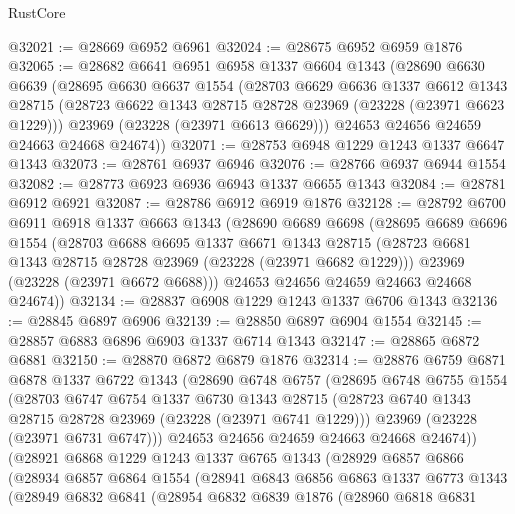 \begin{lexlean}{RustCore}
\begin{coremodule}
@32021 := @28669 @6952 @6961
@32024 := @28675 @6952 @6959 @1876
@32065 := @28682
    @6641
    @6951
    @6958
    @1337
    @6604
    @1343
    (@28690
      @6630
      @6639
      (@28695
        @6630
        @6637
        @1554
        (@28703
          @6629
          @6636
          @1337
          @6612
          @1343
          @28715
          (@28723 @6622 @1343 @28715 @28728 @23969 (@23228 (@23971 @6623 @1229)))
          @23969
          (@23228 (@23971 @6613 @6629)))
        @24653
        @24656
        @24659
        @24663
        @24668
        @24674))
@32071 := @28753 @6948 @1229 @1243 @1337 @6647 @1343
@32073 := @28761 @6937 @6946
@32076 := @28766 @6937 @6944 @1554
@32082 := @28773 @6923 @6936 @6943 @1337 @6655 @1343
@32084 := @28781 @6912 @6921
@32087 := @28786 @6912 @6919 @1876
@32128 := @28792
    @6700
    @6911
    @6918
    @1337
    @6663
    @1343
    (@28690
      @6689
      @6698
      (@28695
        @6689
        @6696
        @1554
        (@28703
          @6688
          @6695
          @1337
          @6671
          @1343
          @28715
          (@28723 @6681 @1343 @28715 @28728 @23969 (@23228 (@23971 @6682 @1229)))
          @23969
          (@23228 (@23971 @6672 @6688)))
        @24653
        @24656
        @24659
        @24663
        @24668
        @24674))
@32134 := @28837 @6908 @1229 @1243 @1337 @6706 @1343
@32136 := @28845 @6897 @6906
@32139 := @28850 @6897 @6904 @1554
@32145 := @28857 @6883 @6896 @6903 @1337 @6714 @1343
@32147 := @28865 @6872 @6881
@32150 := @28870 @6872 @6879 @1876
@32314 := @28876
    @6759
    @6871
    @6878
    @1337
    @6722
    @1343
    (@28690
      @6748
      @6757
      (@28695
        @6748
        @6755
        @1554
        (@28703
          @6747
          @6754
          @1337
          @6730
          @1343
          @28715
          (@28723 @6740 @1343 @28715 @28728 @23969 (@23228 (@23971 @6741 @1229)))
          @23969
          (@23228 (@23971 @6731 @6747)))
        @24653
        @24656
        @24659
        @24663
        @24668
        @24674))
    (@28921
      @6868
      @1229
      @1243
      @1337
      @6765
      @1343
      (@28929
        @6857
        @6866
        (@28934
          @6857
          @6864
          @1554
          (@28941
            @6843
            @6856
            @6863
            @1337
            @6773
            @1343
            (@28949
              @6832
              @6841
              (@28954
                @6832
                @6839
                @1876
                (@28960
                  @6818
                  @6831

\end{coremodule}
\end{lexlean}
